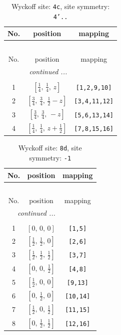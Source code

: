 \documentclass[fleqn,8pt]{jsarticle}
\begin{document}
\renewcommand{\arraystretch}{1.2}
\begin{longtable}{ccc}
\caption{Wyckoff site: {\tt 4c}, site symmetry: {\tt 4'..}}
 \\
 \hline \hline
No. & position & mapping \\ \hline \endfirsthead

\multicolumn{2}{l}{\tablename\ \thetable{}} \\
 \hline \hline
No. & position & mapping \\ \hline \endhead

 \hline \hline
\multicolumn{2}{r}{\footnotesize\it continued ...} \\ \endfoot

 \hline \hline
\multicolumn{2}{r}{} \\ \endlastfoot

1 & $\left[ \frac{1}{4},\, \frac{1}{4},\, z \right]$ & {\tt [1,2,9,10]} \\ \hline
2 & $\left[ \frac{3}{4},\, \frac{3}{4},\, \frac{1}{2} - z \right]$ & {\tt [3,4,11,12]} \\ \hline
3 & $\left[ \frac{3}{4},\, \frac{3}{4},\, - z \right]$ & {\tt [5,6,13,14]} \\ \hline
4 & $\left[ \frac{1}{4},\, \frac{1}{4},\, z + \frac{1}{2} \right]$ & {\tt [7,8,15,16]} \\
\end{longtable}
\renewcommand{\arraystretch}{1.2}
\begin{longtable}{ccc}
\caption{Wyckoff site: {\tt 8d}, site symmetry: {\tt -1}}
 \\
 \hline \hline
No. & position & mapping \\ \hline \endfirsthead

\multicolumn{2}{l}{\tablename\ \thetable{}} \\
 \hline \hline
No. & position & mapping \\ \hline \endhead

 \hline \hline
\multicolumn{2}{r}{\footnotesize\it continued ...} \\ \endfoot

 \hline \hline
\multicolumn{2}{r}{} \\ \endlastfoot

1 & $\left[ 0,\, 0,\, 0 \right]$ & {\tt [1,5]} \\ \hline
2 & $\left[ \frac{1}{2},\, \frac{1}{2},\, 0 \right]$ & {\tt [2,6]} \\ \hline
3 & $\left[ \frac{1}{2},\, \frac{1}{2},\, \frac{1}{2} \right]$ & {\tt [3,7]} \\ \hline
4 & $\left[ 0,\, 0,\, \frac{1}{2} \right]$ & {\tt [4,8]} \\ \hline
5 & $\left[ \frac{1}{2},\, 0,\, 0 \right]$ & {\tt [9,13]} \\ \hline
6 & $\left[ 0,\, \frac{1}{2},\, 0 \right]$ & {\tt [10,14]} \\ \hline
7 & $\left[ \frac{1}{2},\, 0,\, \frac{1}{2} \right]$ & {\tt [11,15]} \\ \hline
8 & $\left[ 0,\, \frac{1}{2},\, \frac{1}{2} \right]$ & {\tt [12,16]} \\
\end{longtable}
\end{document}
